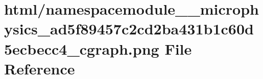 \hypertarget{namespacemodule____microphysics__ad5f89457c2cd2ba431b1c60d5ecbecc4__cgraph_8png}{}\section{html/namespacemodule\+\_\+\+\_\+microphysics\+\_\+ad5f89457c2cd2ba431b1c60d5ecbecc4\+\_\+cgraph.png File Reference}
\label{namespacemodule____microphysics__ad5f89457c2cd2ba431b1c60d5ecbecc4__cgraph_8png}
